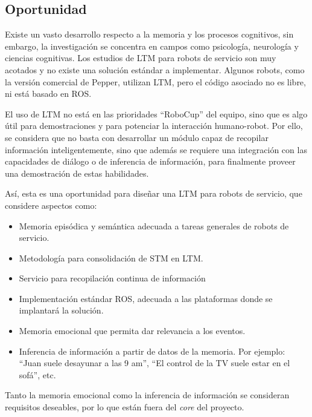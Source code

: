 \subsection{Oportunidad}

Existe un vasto desarrollo respecto a la memoria y los procesos cognitivos, sin embargo, la investigación se concentra en campos como psicología, neurología y ciencias cognitivas. Los estudios de LTM para robots de servicio son muy acotados y no existe una solución estándar a implementar. Algunos robots, como la versión comercial de Pepper, utilizan LTM, pero el código asociado no es libre, ni está basado en ROS.

El uso de LTM no está en las prioridades ``RoboCup'' del equipo, sino que es algo útil para demostraciones y para potenciar la interacción humano-robot. Por ello, se considera que no basta con desarrollar un módulo capaz de recopilar información inteligentemente, sino que además se requiere una integración con las capacidades de diálogo o de inferencia de información, para finalmente proveer una demostración de estas habilidades.

Así, esta es una oportunidad para diseñar una LTM para robots de servicio, que considere aspectos como: 
\begin{itemize}
\item Memoria episódica y semántica adecuada a tareas generales de robots de servicio.
\item Metodología para consolidación de STM en LTM.
\item Servicio para recopilación continua de información
\item Implementación estándar ROS, adecuada a las plataformas donde se implantará la solución.
\item Memoria emocional que permita dar relevancia a los eventos.
\item Inferencia de información a partir de datos de la memoria. Por ejemplo: ``Juan suele desayunar a las 9 am'', ``El control de la TV suele estar en el sofá'', etc.
\end{itemize}

Tanto la memoria emocional como la inferencia de información se consideran requisitos deseables, por lo que están fuera del \textit{core} del proyecto.

